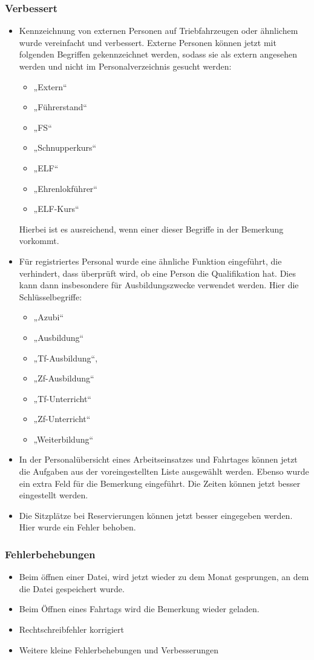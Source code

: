 \subsubsection{Verbessert}
\begin{itemize}
  \item
  Kennzeichnung von externen Personen auf Triebfahrzeugen oder ähnlichem wurde vereinfacht und verbessert. Externe Personen können jetzt mit folgenden Begriffen gekennzeichnet werden, sodass sie als extern angesehen werden und nicht im Personalverzeichnis gesucht werden:
  \begin{itemize}
    \item „Extern“
    \item „Führerstand“
    \item „FS“
    \item „Schnupperkurs“
    \item „ELF“
    \item „Ehrenlokführer“
    \item „ELF-Kurs“
  \end{itemize}
  Hierbei ist es ausreichend, wenn einer dieser Begriffe in der Bemerkung vorkommt.
  \item
  Für registriertes Personal wurde eine ähnliche Funktion eingeführt, die verhindert, dass überprüft wird, ob eine Person die Qualifikation hat. Dies kann dann insbesondere für Ausbildungszwecke verwendet werden. Hier die Schlüsselbegriffe:
  \begin{itemize}
    \item   „Azubi“
    \item  „Ausbildung“
    \item  „Tf-Ausbildung“,
    \item  „Zf-Ausbildung“
    \item  „Tf-Unterricht“
    \item  „Zf-Unterricht“
    \item  „Weiterbildung“
  \end{itemize}
  \item
  In der Personalübersicht eines Arbeitseinsatzes und Fahrtages können jetzt die Aufgaben aus der voreingestellten Liste ausgewählt werden. Ebenso wurde ein extra Feld für die Bemerkung eingeführt. Die Zeiten können jetzt besser eingestellt werden.
  \item
  Die Sitzplätze bei Reservierungen können jetzt besser eingegeben werden. Hier wurde ein Fehler behoben.
\end{itemize}

\subsubsection{Fehlerbehebungen}
\begin{itemize}
  \item
  Beim öffnen einer Datei, wird jetzt wieder zu dem Monat gesprungen, an dem die Datei gespeichert wurde.
  \item
  Beim Öffnen eines Fahrtags wird die Bemerkung wieder geladen.
  \item
  Rechtschreibfehler korrigiert
  \item
  Weitere kleine Fehlerbehebungen und Verbesserungen
\end{itemize}
